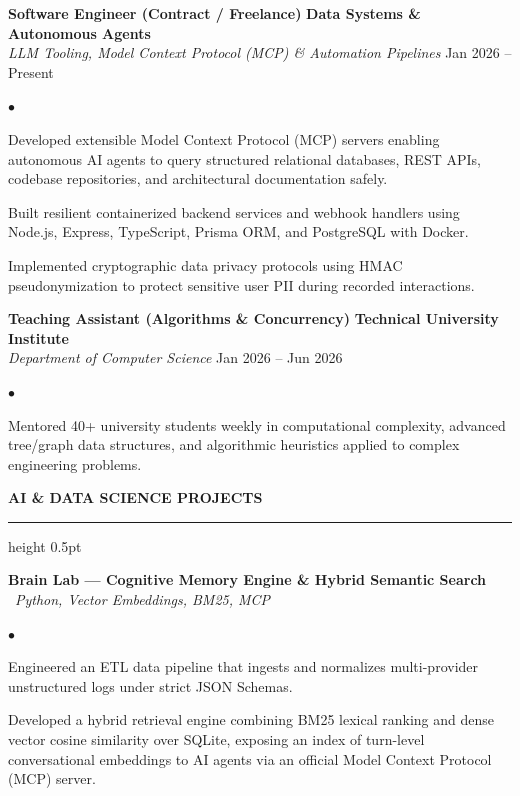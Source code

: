 \documentclass[10pt,letterpaper]{article}
\newcommand{\resumesection}[1]{%
  \vspace{2pt}%
  {\color{primary}\normalsize\bfseries\MakeUppercase{#1}}%
  \vspace{1pt}\hrule height 0.5pt\vspace{2pt}%
}
\renewenvironment{itemize}{%
  \begin{list}{\color{primary}$\bullet$}{%
    \setlength{\leftmargin}{1.1em}%
    \setlength{\itemsep}{0.5pt}%
    \setlength{\topsep}{1pt}%
    \setlength{\parsep}{0pt}%
    \setlength{\partopsep}{0pt}%
  }%
}{%
  \end{list}%
}
\begin{document}
\vspace{1.5pt}

\textbf{Software Engineer (Contract / Freelance)} \hfill \textbf{Data Systems \& Autonomous Agents} \\
\textit{LLM Tooling, Model Context Protocol (MCP) \& Automation Pipelines} \hfill Jan 2026 -- Present
\begin{itemize}
    \item Developed extensible Model Context Protocol (MCP) servers enabling autonomous AI agents to query structured relational databases, REST APIs, codebase repositories, and architectural documentation safely.
    \item Built resilient containerized backend services and webhook handlers using Node.js, Express, TypeScript, Prisma ORM, and PostgreSQL with Docker.
    \item Implemented cryptographic data privacy protocols using HMAC pseudonymization to protect sensitive user PII during recorded interactions.
\end{itemize}

\vspace{1.5pt}

\textbf{Teaching Assistant (Algorithms \& Concurrency)} \hfill \textbf{Technical University Institute} \\
\textit{Department of Computer Science} \hfill Jan 2026 -- Jun 2026
\begin{itemize}
    \item Mentored 40+ university students weekly in computational complexity, advanced tree/graph data structures, and algorithmic heuristics applied to complex engineering problems.
\end{itemize}

\resumesection{AI \& Data Science Projects}

\textbf{Brain Lab — Cognitive Memory Engine \& Hybrid Semantic Search} \textbar\ \textit{Python, Vector Embeddings, BM25, MCP}
\begin{itemize}
    \item Engineered an ETL data pipeline that ingests and normalizes multi-provider unstructured logs under strict JSON Schemas.
    \item Developed a hybrid retrieval engine combining BM25 lexical ranking and dense vector cosine similarity over SQLite, exposing an index of turn-level conversational embeddings to AI agents via an official Model Context Protocol (MCP) server.
\end{itemize}
\end{document}
